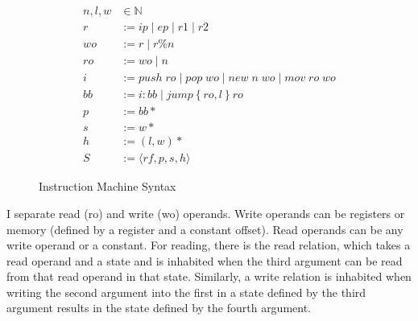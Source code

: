 \begin{figure}
\begin{align}
n, l, w &\in \mathbb{N} \tag{Machine Word} \\
r &:= ip \; | \; ep \; | \; r1 \; | \; r2 \tag{Registers} \\
wo &:= r \; | \; r \% n \tag{Write Operands} \\
ro &:= wo \; | \; n \tag{Read Operands} \\
i &:= \mathit{push} \; ro \; | \; \mathit{pop} \; wo \; | \; \mathit{new} \; n
\; wo \; | \; \mathit{mov} \; ro \; wo \tag{Instructions} \\
bb &:= i : bb \; | \; \mathit{jump} \left\{ro, l\right\} ro \tag{Basic Block} \\
p &:= bb* \tag{Program} \\
s &:= w* \tag{Stack} \\
h &:= \left(l, w\right)* \tag{Heap}\\
S &:= \langle rf, p, s, h \rangle \tag{State} 
\end{align}
\caption{Instruction Machine Syntax}
\label{fig:im_syntax}
\end{figure}

I separate read (ro) and write (wo) operands. Write operands can be registers
or memory (defined by a register and a constant offset). Read operands can be
any write operand or a constant. For reading, there is the read relation, which
takes a read operand and a state and is inhabited when the third argument can be
read from that read operand in that state. Similarly, a write relation is
inhabited when writing the second argument into the first in a state defined by
the third argument results in the state defined by the fourth argument.  

